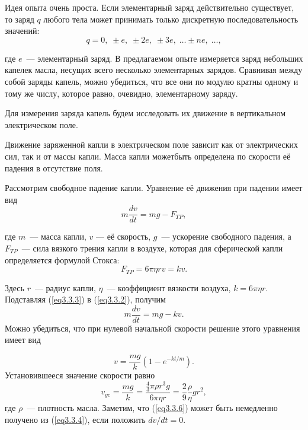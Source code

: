 



Идея опыта очень проста. Если элементарный заряд действительно существует, то заряд $q$ любого тела может принимать
только дискретную последовательность значений:
\begin{equation}
q=0,\;\pm e,\;\pm 2e,\;\pm 3e,\;\ldots\pm ne,\;\ldots,
\label{eq3.3.1}
\end{equation}

где $e$~--- элементарный заряд. В предлагаемом опыте измеряется заряд небольших капелек масла, несущих всего несколько элементарных зарядов. Сравнивая между собой заряды капель, можно убедиться, что все они по модулю кратны одному и тому же числу, которое равно, очевидно, элементарному заряду.

Для измерения заряда капель будем исследовать их движение в вертикальном электрическом поле.

Движение заряженной капли в электрическом поле зависит как от электрических сил, так и от массы капли. Масса капли можетбыть определена по скорости её падения в отсутствие поля.

Рассмотрим свободное падение капли. Уравнение её движения при падении имеет вид
\begin{equation}
m\frac{dv}{dt}=mg-F_{TP},
\label{eq3.3.2}
\end{equation}

где $m$~--- масса капли, $v$ --- её скорость, $g$~--- ускорение свободного падения, а $F_{TP}$~--- сила вязкого трения капли в воздухе, которая для сферической капли определяется формулой Стокса:
\begin{equation}
F_{TP}=6\pi\eta rv=kv.
\label{eq3.3.3}
\end{equation}

Здесь $r$~--- радиус капли, $\eta$~--- коэффициент вязкости воздуха, $k=6\pi\eta r$. Подставляя (\ref{eq3.3.3}) в (\ref{eq3.3.2}), получим
\begin{equation}
m\frac{dv}{dt}=mg -kv.
\label{eq3.3.4}
\end{equation}
Можно убедиться, что при нулевой начальной скорости решение этого уравнения имеет вид

\begin{equation}
v=\frac{mg }{k}\left(1-e^{-kt/m}\right).
\label{eq3.3.5}
\end{equation}
Установившееся значение скорости равно
\begin{equation}
v_{yc}=\frac{mg }{k}=\frac{\frac 43 \pi\rho r^3g }{6\pi\eta r}=\frac29\frac{\rho}{\eta}g r^2,
\label{eq3.3.6}
\end{equation}
где $\rho$~--- плотность масла. Заметим, что (\ref{eq3.3.6}) может быть немедленно получено из (\ref{eq3.3.4}), если положить $dv/dt=0$.


